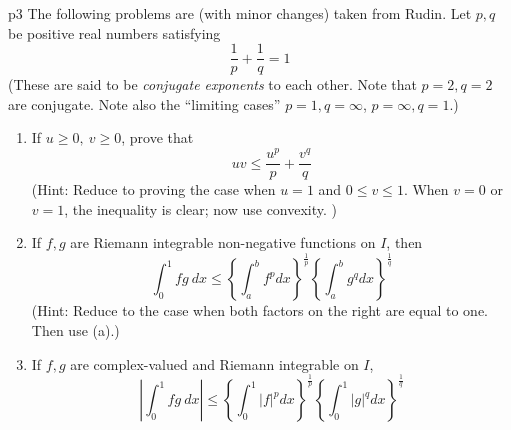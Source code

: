 \documentclass[a4paper, 11pt]{article}
\begin{document}



\begin{problem}{%
}{p3%
}
The following problems are (with minor changes) taken from Rudin.  Let $p,q$ be positive real numbers satisfying
\[
\frac{1}{p} + \frac{1}{q} =1 
\]
(These  are said to be \emph{conjugate exponents} to each other. Note that $p=2,q=2$ are conjugate. Note also the ``limiting cases'' $p=1,q=\infty$, $p=\infty, q=1$.)
\begin{enumerate}[label=(\alph*)]
	\item If $u \ge 0, \ v \ge 0$, prove that
	\[
	uv \le \frac{u^p}{p}+\frac{v^q}{q}
	\]
	(Hint: Reduce to proving the case when $u=1$ and $0 \le v \le 1$. When $v=0$ or $v=1$, the inequality is clear; now use convexity. )
	
	\item  If $f,g$ are Riemann integrable non-negative functions on $I$, then
	\[
	\int_0^1 fg\ dx  \le \left\{\int_a^b f^p dx\right\}^{\frac{1}{p}} \left\{\int_a^b g^q dx\right\}^{\frac{1}{q}}
	\]
	(Hint: Reduce to the case when both factors on the right are equal to one. Then use (a).)
	
	\item If $f,g$ are complex-valued and Riemann integrable on $I$,
	\[
	\left|\int_0^1 fg\ dx\right|  \le \left\{\int_0^1 |f|^p dx\right\}^{\frac{1}{p}} \left\{\int_0^1 |g|^q dx\right\}^{\frac{1}{q}}
	\]
\end{enumerate} 	
\end{problem}
\end{document}

